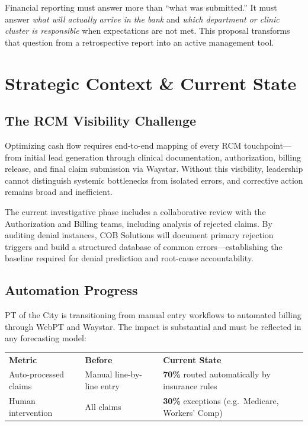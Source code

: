 \documentclass[11pt,a4paper]{article}
\begin{document}
\begin{tcolorbox}[rulebox,title={The ``So What?''}]
Financial reporting must answer more than ``what was submitted.'' It must answer
\emph{what will actually arrive in the bank} and \emph{which department or clinic cluster
is responsible} when expectations are not met. This proposal transforms that question
from a retrospective report into an active management tool.
\end{tcolorbox}


\section{Strategic Context \& Current State}

\subsection{The RCM Visibility Challenge}

Optimizing cash flow requires end-to-end mapping of every RCM touchpoint---from initial
lead generation through clinical documentation, authorization, billing release, and
final claim submission via Waystar. Without this visibility, leadership cannot distinguish
systemic bottlenecks from isolated errors, and corrective action remains broad and inefficient.

The current investigative phase includes a collaborative review with the Authorization and
Billing teams, including analysis of rejected claims. By auditing denial instances,
COB Solutions will document primary rejection triggers and build a structured database of
common errors---establishing the baseline required for denial prediction and root-cause
accountability.

\subsection{Automation Progress}

PT of the City is transitioning from manual entry workflows to automated billing through
WebPT and Waystar. The impact is substantial and must be reflected in any forecasting model:

\begin{center}
\begin{tabularx}{0.92\linewidth}{L{4.2cm} C{2.8cm} X}
  \color{white}\textbf{Metric} & \color{white}\textbf{Before} & \color{white}\textbf{Current State} \\
  Auto-processed claims     & Manual line-by-line entry  & \textbf{70\%} routed automatically by insurance rules \\
  Human intervention        & All claims                 & \textbf{30\%} exceptions (e.g.\ Medicare, Workers' Comp) \\
\end{tabularx}
\end{center}
\end{document}
